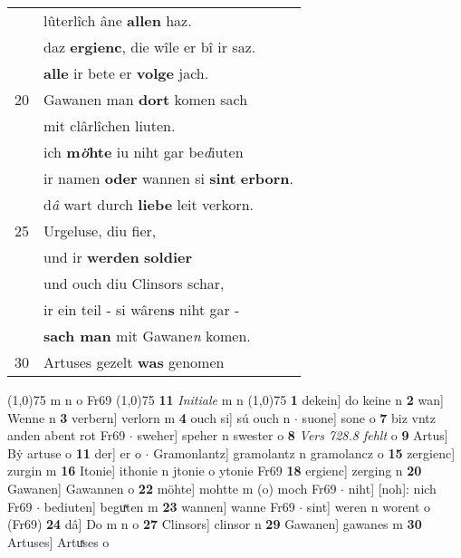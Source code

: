 \documentclass[8pt,a4paper,notitlepage]{article}
\begin{document}
\begin{table}[ht]
\begin{minipage}[t]{0.5\linewidth}
\begin{tabular}{rl}
 & lûterlîch âne \textbf{allen} haz.\\ 
 & daz \textbf{ergienc}, die wîle er bî ir saz.\\ 
 & \textbf{alle} ir bete er \textbf{volge} jach.\\ 
20 & Gawanen man \textbf{dort} komen sach\\ 
 & mit clârlîchen liuten.\\ 
 & ich \textbf{m\textit{ö}hte} iu niht gar be\textit{d}iuten\\ 
 & ir namen \textbf{oder} wannen si \textbf{sint} \textbf{erborn}.\\ 
 & d\textit{â} wart durch \textbf{liebe} leit verkorn.\\ 
25 & Urgeluse, diu fier,\\ 
 & und ir \textbf{werden} \textbf{soldier}\\ 
 & und ouch diu Clinsors schar,\\ 
 & ir ein teil - si wâren\textbf{s} niht gar -\\ 
 & \textbf{sach man} mit Gawane\textit{n} komen.\\ 
30 & Artuses gezelt \textbf{was} genomen\\ 
\end{tabular}
\scriptsize
\line(1,0){75} \newline
m n o Fr69 \newline
\line(1,0){75} \newline
\textbf{11} \textit{Initiale} m n  \newline
\line(1,0){75} \newline
\textbf{1} dekein] do keine n \textbf{2} wan] Wenne n \textbf{3} verbern] verlorn m \textbf{4} ouch si] sú ouch n  $\cdot$ suone] sone o \textbf{7} biz vntz anden abent rot Fr69  $\cdot$ sweher] speher n swester o \textbf{8} \textit{Vers 728.8 fehlt} o  \textbf{9} Artus] Bẏ artuse o \textbf{11} der] er o  $\cdot$ Gramonlantz] gramolantz n gramolancz o \textbf{15} zergienc] zurgin m \textbf{16} Itonie] ithonie n jtonie o ytonie Fr69 \textbf{18} ergienc] zerging n \textbf{20} Gawanen] Gawannen o \textbf{22} möhte] mohtte m (o) moch Fr69  $\cdot$ niht] [noh]: nich Fr69  $\cdot$ bediuten] beguͯten m \textbf{23} wannen] wanne Fr69  $\cdot$ sint] weren n worent o (Fr69) \textbf{24} dâ] Do m n o \textbf{27} Clinsors] clinsor n \textbf{29} Gawanen] gawanes m \textbf{30} Artuses] Artuͯses o \newline
\end{minipage}
\end{table}
\newpage
\end{document}
